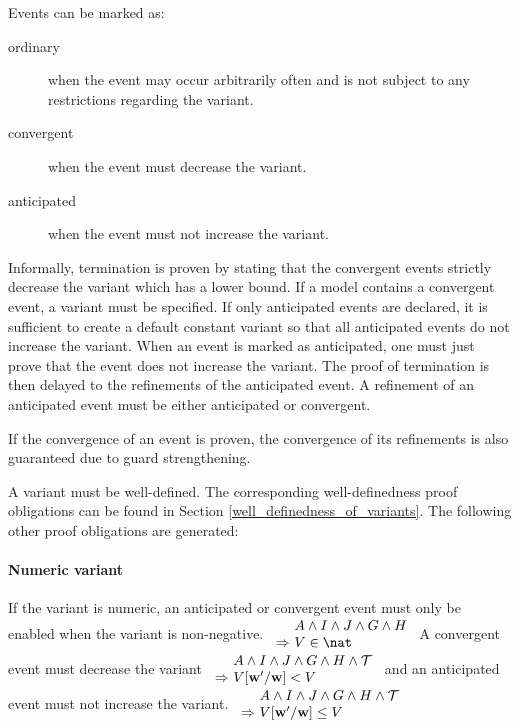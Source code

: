 Events can be marked as:
\begin{description}
\item[ordinary] when the event may occur arbitrarily often and is not subject to any restrictions
  regarding the variant.
\item[convergent] when the event must decrease the variant.
\item[anticipated] when the event must not increase the variant.
\end{description}
Informally, termination is proven by stating that the convergent events strictly decrease the variant
  which has a lower bound.
If a model contains a convergent event, a variant must be specified.
If only anticipated events are declared, it is sufficient to create a default constant variant so
  that all anticipated events do not increase the variant.
When an event is marked as anticipated, one must just prove that the event does not increase the
  variant.
The proof of termination is then delayed to the refinements of the anticipated event.
A refinement of an anticipated event must be either anticipated or convergent.

If the convergence of an event is proven, the convergence of its refinements is also guaranteed due to guard strengthening.

A variant must be well-defined. The corresponding well-definedness proof obligations
  can be found in Section \ref{well_definedness_of_variants}.
The following other proof obligations are generated:

\paragraph{Numeric variant}
\label{numeric_variant}
  If the variant is numeric, an anticipated or convergent event
  must only be enabled when the variant is non-negative.
%
  {$\begin{array}{r@{\ }l}
      & A \land I \land J \land G \land H \\
      \limp & V\in\nat
    \end{array}$}
A convergent event must decrease the variant
%
  {$\begin{array}{r@{\ }l}
      & A \land I \land J \land G \land H \land \concbeforeafter \\
      \limp & V[\varlist{w}'/\varlist{w}]<V
    \end{array}$}
and an anticipated event must not increase the variant.
%
  {$\begin{array}{r@{\ }l}
      & A \land I \land J \land G \land H \land \concbeforeafter \\
      \limp & V[\varlist{w}'/\varlist{w}]\leq V
    \end{array}$}

